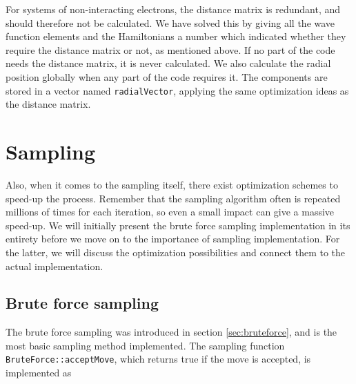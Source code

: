 For systems of non-interacting electrons, the distance matrix is redundant, and should therefore not be calculated. We have solved this by giving all the wave function elements and the Hamiltonians a number which indicated whether they require the distance matrix or not, as mentioned above. If no part of the code needs the distance matrix, it is never calculated. We also calculate the radial position globally when any part of the code requires it. The components are stored in a vector named \lstinline{radialVector}, applying the same optimization ideas as the distance matrix. 

\section{Sampling} \label{sec:sampling}
Also, when it comes to the sampling itself, there exist optimization schemes to speed-up the process. Remember that the sampling algorithm often is repeated millions of times for each iteration, so even a small impact can give a massive speed-up. We will initially present the brute force sampling implementation in its entirety before we move on to the importance of sampling implementation. For the latter, we will discuss the optimization possibilities and connect them to the actual implementation.

\subsection{Brute force sampling}
The brute force sampling was introduced in section \ref{sec:bruteforce}, and is the most basic sampling method implemented. The sampling function \lstinline{BruteForce::acceptMove}, which returns true if the move is accepted, is implemented as

